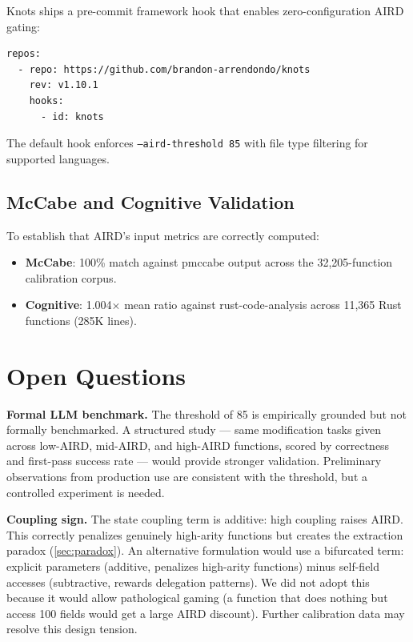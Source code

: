 \documentclass[10pt,twocolumn,letterpaper]{article}
\begin{document}
Knots ships a pre-commit framework hook that enables zero-configuration
AIRD gating:

\begin{lstlisting}
repos:
  - repo: https://github.com/brandon-arrendondo/knots
    rev: v1.10.1
    hooks:
      - id: knots
\end{lstlisting}

The default hook enforces \texttt{--aird-threshold 85} with file type
filtering for supported languages.

\subsection{McCabe and Cognitive Validation}

To establish that AIRD's input metrics are correctly computed:
\begin{itemize}
    \item \textbf{McCabe}: 100\% match against pmccabe output across the
        32,205-function calibration corpus.
    \item \textbf{Cognitive}: 1.004$\times$ mean ratio against
        rust-code-analysis across 11,365 Rust functions (285K lines).
\end{itemize}

\section{Open Questions}
\label{sec:open}

\textbf{Formal LLM benchmark.}  The threshold of 85 is empirically grounded
but not formally benchmarked.  A structured study --- same modification
tasks given across low-AIRD, mid-AIRD, and high-AIRD functions, scored
by correctness and first-pass success rate --- would provide stronger
validation.  Preliminary observations from production use are consistent
with the threshold, but a controlled experiment is needed.

\textbf{Coupling sign.}  The state coupling term is additive: high coupling
raises AIRD.  This correctly penalizes genuinely high-arity functions but
creates the extraction paradox (\cref{sec:paradox}).  An alternative
formulation would use a bifurcated term: explicit parameters (additive,
penalizes high-arity functions) minus self-field accesses (subtractive,
rewards delegation patterns).  We did not adopt this because it would
allow pathological gaming (a function that does nothing but access 100
fields would get a large AIRD discount).  Further calibration data may
resolve this design tension.
\end{document}
